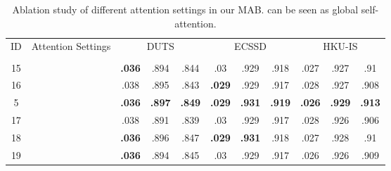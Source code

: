 \documentclass[lettersize,journal]{IEEEtran}
\begin{document}
\begin{table}
	\centering
	\scriptsize
	\caption{Ablation study of different attention settings in our MAB.  can be seen as global self-attention. }
	\label{tab:mab}
	\setlength\tabcolsep{0.3mm}
	\begin{tabular}{c|c|ccc|ccc|ccc}\hline
		\multirow{2}{*}{ID} & \multirow{2}{*}{Attention Settings} & \multicolumn{3}{c|}{DUTS} & \multicolumn{3}{c|}{ECSSD} & \multicolumn{3}{c}{HKU-IS}\\
		&&  &  &  &  &  &  &  &  &  \\
		\hline
		15 &  & \textbf{.036} & .894 & .844 & {.03} & {.929} & .918 & {.027} & {.927} & .91 \\
		16 &  & .038 & .895 & .843 & \textbf{.029} & {.929} & .917 & {.028} & {.927} & .908 \\
		5 &  & \textbf{.036} & \textbf{.897} & \textbf{.849} & \textbf{.029} & \textbf{.931} & \textbf{.919} & \textbf{.026} & \textbf{.929} & \textbf{.913} \\
		17 &  & {.038} & {.891} & {.839} & {.03} & {.929} & {.917} & {.028} & {.926} & {.906} \\
		18 &  & \textbf{.036} & {.896} & {.847} & \textbf{.029} & \textbf{.931} & {.918} & {.027} & {.928} & {.91} \\
		19 &  & \textbf{.036} & .894 & .845 & {.03} & .929 & .917 & {.026} & {.926} & .909 \\
\hline
	\end{tabular}
\end{table}
\end{document}
